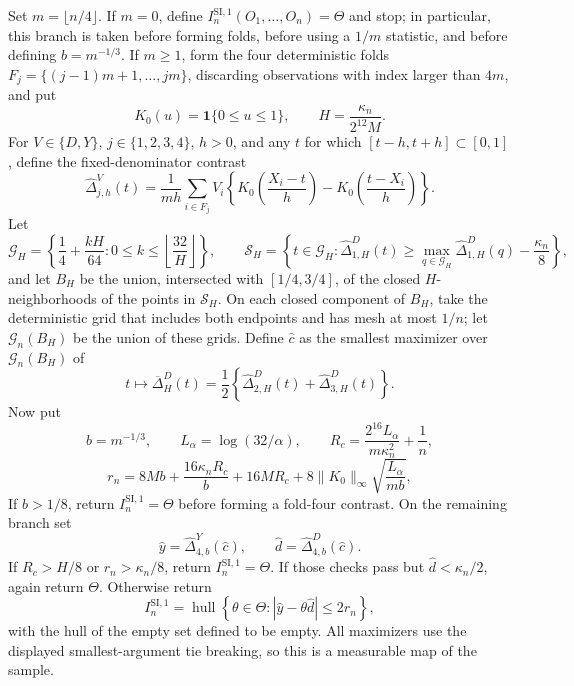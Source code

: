 Set \(m=\lfloor n/4\rfloor\).  If \(m=0\), define
\(I_n^{\mathrm{SI},1}(O_1,\ldots,O_n)=\Theta\) and stop; in
particular, this branch is taken before forming folds, before using a
\(1/m\) statistic, and before defining \(b=m^{-1/3}\).  If \(m\ge1\),
form the four deterministic folds
\(F_j=\{(j-1)m+1,\ldots,jm\}\), discarding observations with index
larger than \(4m\), and put
\[
 K_0(u)=\mathbf 1\{0\le u\le1\},\qquad
 H=\frac{\kappa_n}{2^{12}M}.
\]
For \(V\in\{D,Y\}\), \(j\in\{1,2,3,4\}\), \(h>0\), and any
\(t\) for which \([t-h,t+h]\subset[0,1]\), define the fixed-denominator
contrast
\[
 \widehat\Delta_{j,h}^{V}(t)
 =\frac1{mh}\sum_{i\in F_j}V_i
 \left\{K_0\!\left(\frac{X_i-t}{h}\right)
       -K_0\!\left(\frac{t-X_i}{h}\right)\right\}.
\]
Let
\[
 \mathcal G_H=\left\{\frac14+\frac{kH}{64}:
 0\le k\le\left\lfloor\frac{32}{H}\right\rfloor\right\},
 \qquad
 \mathcal S_H=\left\{t\in\mathcal G_H:
 \widehat\Delta_{1,H}^{D}(t)
 \ge\max_{q\in\mathcal G_H}\widehat\Delta_{1,H}^{D}(q)
       -\frac{\kappa_n}{8}\right\},
\]
and let \(B_H\) be the union, intersected with \([1/4,3/4]\), of the
closed \(H\)-neighborhoods of the points in \(\mathcal S_H\).  On each
closed component of \(B_H\), take the deterministic grid that includes
both endpoints and has mesh at most \(1/n\); let \(\mathcal G_n(B_H)\)
be the union of these grids.  Define \(\widehat c\) as the smallest
maximizer over \(\mathcal G_n(B_H)\) of
\[
 t\longmapsto
 \overline\Delta_H^D(t)
 =\frac12\left\{\widehat\Delta_{2,H}^{D}(t)
                 +\widehat\Delta_{3,H}^{D}(t)\right\}.
\]
Now put
\[
 b=m^{-1/3},\qquad L_\alpha=\log(32/\alpha),\qquad
 R_c=\frac{2^{16}L_\alpha}{m\kappa_n^2}+\frac1n,
\]
\[
 r_n=8Mb+\frac{16\kappa_nR_c}{b}+16MR_c
     +8\|K_0\|_\infty\sqrt{\frac{L_\alpha}{mb}},
\]
If \(b>1/8\), return \(I_n^{\mathrm{SI},1}=\Theta\) before forming a
fold-four contrast.  On the remaining branch set
\[
 \widehat y=\widehat\Delta_{4,b}^{Y}(\widehat c),
 \qquad
 \widehat d=\widehat\Delta_{4,b}^{D}(\widehat c).
\]
If \(R_c>H/8\) or \(r_n>\kappa_n/8\), return
\(I_n^{\mathrm{SI},1}=\Theta\).  If those checks pass but
\(\widehat d<\kappa_n/2\), again return \(\Theta\).  Otherwise return
\[
 I_n^{\mathrm{SI},1}
 =\operatorname{hull}\left\{\theta\in\Theta:
       |\widehat y-\theta\widehat d|\le2r_n\right\},
\]
with the hull of the empty set defined to be empty.  All maximizers use
the displayed smallest-argument tie breaking, so this is a measurable
map of the sample.

